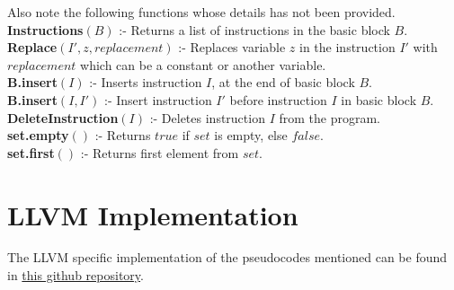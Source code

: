 Also note the following functions whose details has not been provided.\\
\textbf{Instructions}$(B)$ :- Returns a list of instructions in the basic block $B$.\\
\textbf{Replace}$(I', z, replacement)$ :- Replaces variable $z$ in the instruction $I'$ with $replacement$ which can be a constant or another variable.\\
\textbf{B.insert}$(I)$ :- Inserts instruction $I$, at the end of basic block $B$.\\
\textbf{B.insert}$(I, I')$ :- Insert instruction $I'$ before instruction $I$ in basic block $B$.\\
\textbf{DeleteInstruction}$(I)$ :- Deletes instruction $I$ from the program.\\
\textbf{set.empty}$()$ :- Returns $true$ if $set$ is empty, else $false$.\\
\textbf{set.first}$()$ :- Returns first element from $set$.\\

\section{LLVM Implementation}
\label{LLVMImplementation}
The LLVM specific implementation of the pseudocodes mentioned can be found in 
\href{https://github.com/himanshu520/HerbrandEquivalence}{this github repository}.